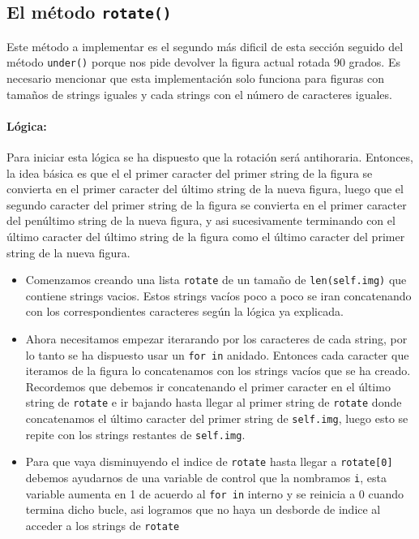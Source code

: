 \documentclass[10pt, a4paper]{article}
\newcommand{\mintpython}[1]{\texttt{#1}}
\begin{document}
\subsection{El método \mintpython{rotate()}}
Este método a implementar es el segundo más dificil de esta sección seguido del método \mintpython{under()} porque nos pide devolver la figura actual rotada 90 grados. Es necesario mencionar que esta implementación solo funciona para figuras con tamaños de strings iguales y cada strings con el número de caracteres iguales.
\paragraph{Lógica:}Para iniciar esta lógica se ha dispuesto que la rotación será antihoraria. Entonces, la idea básica es que el el primer caracter del primer string de la figura se convierta en el primer caracter del último string de la nueva figura, luego que el segundo caracter del primer string de la figura se convierta en el primer caracter del penúltimo string de la nueva figura, y asi sucesivamente terminando con el último caracter del último string de la figura como el último caracter del primer string de la nueva figura.

\begin{itemize}
  \item Comenzamos creando una lista \mintpython{rotate} de un tamaño de \mintpython{len(self.img)} que contiene strings vacios. Estos strings vacíos poco a poco se iran concatenando con los correspondientes caracteres según la lógica ya explicada.
  \item Ahora necesitamos empezar iterarando por los caracteres de cada string, por lo tanto se ha dispuesto usar un \mintpython{for in} anidado. Entonces cada caracter que iteramos de la figura lo concatenamos con los strings vacíos que se ha creado. Recordemos que debemos ir concatenando el primer caracter en el último string de \mintpython{rotate} e ir bajando hasta llegar al primer string de \mintpython{rotate} donde concatenamos el último caracter del primer string de \mintpython{self.img}, luego esto se repite con los strings restantes de \mintpython{self.img}.
  \item Para que vaya disminuyendo el indice de \mintpython{rotate} hasta llegar a \mintpython{rotate[0]} debemos ayudarnos de una variable de control que la nombramos \mintpython{i}, esta variable aumenta en 1 de acuerdo al \mintpython{for in} interno y se reinicia a 0 cuando termina dicho bucle, asi logramos que no haya un desborde de indice al acceder a los strings de \mintpython{rotate}
\end{itemize}
\end{document}
